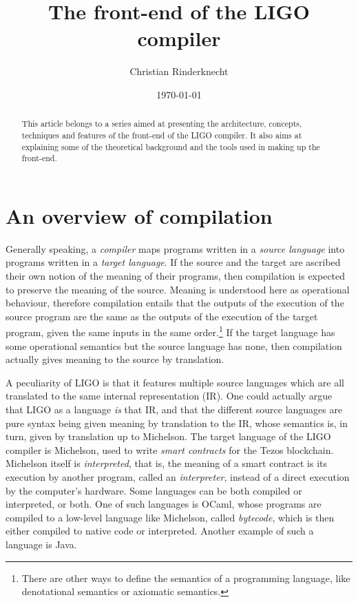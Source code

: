 \documentclass[12pt,a4paper]{article}
\title{The front-end of the LIGO compiler}
\author{\Large Christian Rinderknecht}
\date{\today}
\begin{document}
\maketitle

\begin{abstract}
  This article belongs to a series aimed at presenting the
  architecture, concepts, techniques and features of the
  front\hyp{}end of the LIGO compiler. It also aims at explaining some
  of the theoretical background and the tools used in making up the
  front\hyp{}end.
\end{abstract}

\section{An overview of compilation}

Generally speaking, a \emph{compiler} maps programs written in a
\emph{source language} into programs written in a \emph{target
  language}. If the source and the target are ascribed their own
notion of the meaning of their programs, then compilation is expected
to preserve the meaning of the source. Meaning is understood here as
operational behaviour, therefore compilation entails that the outputs
of the execution of the source program are the same as the outputs of
the execution of the target program, given the same inputs in the same
order.\footnote{There are other ways to define the semantics of a
  programming language, like denotational semantics or axiomatic
  semantics.} If the target language has some operational semantics
but the source language has none, then compilation actually gives
meaning to the source by translation.

A peculiarity of LIGO is that it features multiple source languages
which are all translated to the same internal representation (IR). One
could actually argue that LIGO as a language \emph{is} that IR, and
that the different source languages are pure syntax being given
meaning by translation to the IR, whose semantics is, in turn, given
by translation up to Michelson. The target language of the LIGO
compiler is Michelson, used to write \emph{smart contracts} for the
Tezos blockchain. Michelson itself is \emph{interpreted}, that is, the
meaning of a smart contract is its execution by another program,
called an \emph{interpreter}, instead of a direct execution by the
computer's hardware. Some languages can be both compiled or
interpreted, or both. One of such languages is OCaml, whose programs
are compiled to a low-level language like Michelson, called
\emph{bytecode}, which is then either compiled to native code or
interpreted. Another example of such a language is Java.
\end{document}
